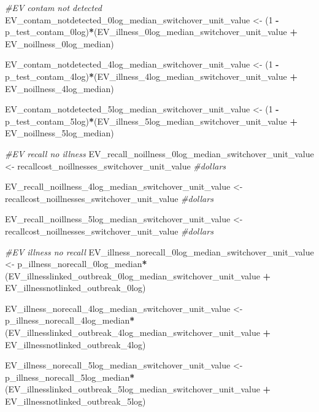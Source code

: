 \documentclass[
]{article}
\newenvironment{Shaded}{\begin{snugshade}}{\end{snugshade}}
\newcommand{\CommentTok}[1]{\textcolor[rgb]{0.56,0.35,0.01}{\textit{#1}}}
\newcommand{\DecValTok}[1]{\textcolor[rgb]{0.00,0.00,0.81}{#1}}
\newcommand{\NormalTok}[1]{#1}
\newcommand{\OtherTok}[1]{\textcolor[rgb]{0.56,0.35,0.01}{#1}}
\newcommand{\SpecialCharTok}[1]{\textcolor[rgb]{0.81,0.36,0.00}{\textbf{#1}}}
\begin{document}
\begin{Shaded}
\begin{Highlighting}[]
\CommentTok{\#EV contam not detected}
\NormalTok{EV\_contam\_notdetected\_0log\_median\_switchover\_unit\_value }\OtherTok{\textless{}{-}}\NormalTok{ (}\DecValTok{1} \SpecialCharTok{{-}}\NormalTok{ p\_test\_contam\_0log)}\SpecialCharTok{*}\NormalTok{(EV\_illness\_0log\_median\_switchover\_unit\_value }\SpecialCharTok{+}\NormalTok{ EV\_noillness\_0log\_median)}

\NormalTok{EV\_contam\_notdetected\_4log\_median\_switchover\_unit\_value }\OtherTok{\textless{}{-}}\NormalTok{ (}\DecValTok{1} \SpecialCharTok{{-}}\NormalTok{ p\_test\_contam\_4log)}\SpecialCharTok{*}\NormalTok{(EV\_illness\_4log\_median\_switchover\_unit\_value }\SpecialCharTok{+}\NormalTok{ EV\_noillness\_4log\_median)}

\NormalTok{EV\_contam\_notdetected\_5log\_median\_switchover\_unit\_value }\OtherTok{\textless{}{-}}\NormalTok{ (}\DecValTok{1} \SpecialCharTok{{-}}\NormalTok{ p\_test\_contam\_5log)}\SpecialCharTok{*}\NormalTok{(EV\_illness\_5log\_median\_switchover\_unit\_value }\SpecialCharTok{+}\NormalTok{ EV\_noillness\_5log\_median)}


\CommentTok{\#EV recall no illness}
\NormalTok{EV\_recall\_noillness\_0log\_median\_switchover\_unit\_value }\OtherTok{\textless{}{-}}\NormalTok{ recallcost\_noillnesses\_switchover\_unit\_value }\CommentTok{\#dollars}

\NormalTok{EV\_recall\_noillness\_4log\_median\_switchover\_unit\_value }\OtherTok{\textless{}{-}}\NormalTok{ recallcost\_noillnesses\_switchover\_unit\_value }\CommentTok{\#dollars}

\NormalTok{EV\_recall\_noillness\_5log\_median\_switchover\_unit\_value }\OtherTok{\textless{}{-}}\NormalTok{ recallcost\_noillnesses\_switchover\_unit\_value }\CommentTok{\#dollars}

\CommentTok{\#EV illness no recall}
\NormalTok{EV\_illness\_norecall\_0log\_median\_switchover\_unit\_value }\OtherTok{\textless{}{-}}\NormalTok{ p\_illness\_norecall\_0log\_median}\SpecialCharTok{*}\NormalTok{(EV\_illnesslinked\_outbreak\_0log\_median\_switchover\_unit\_value }\SpecialCharTok{+}\NormalTok{ EV\_illnessnotlinked\_outbreak\_0log)}

\NormalTok{EV\_illness\_norecall\_4log\_median\_switchover\_unit\_value }\OtherTok{\textless{}{-}}\NormalTok{ p\_illness\_norecall\_4log\_median}\SpecialCharTok{*}\NormalTok{(EV\_illnesslinked\_outbreak\_4log\_median\_switchover\_unit\_value }\SpecialCharTok{+}\NormalTok{ EV\_illnessnotlinked\_outbreak\_4log)}

\NormalTok{EV\_illness\_norecall\_5log\_median\_switchover\_unit\_value }\OtherTok{\textless{}{-}}\NormalTok{ p\_illness\_norecall\_5log\_median}\SpecialCharTok{*}\NormalTok{(EV\_illnesslinked\_outbreak\_5log\_median\_switchover\_unit\_value }\SpecialCharTok{+}\NormalTok{ EV\_illnessnotlinked\_outbreak\_5log)}



\end{Highlighting}
\end{Shaded}
\end{document}

